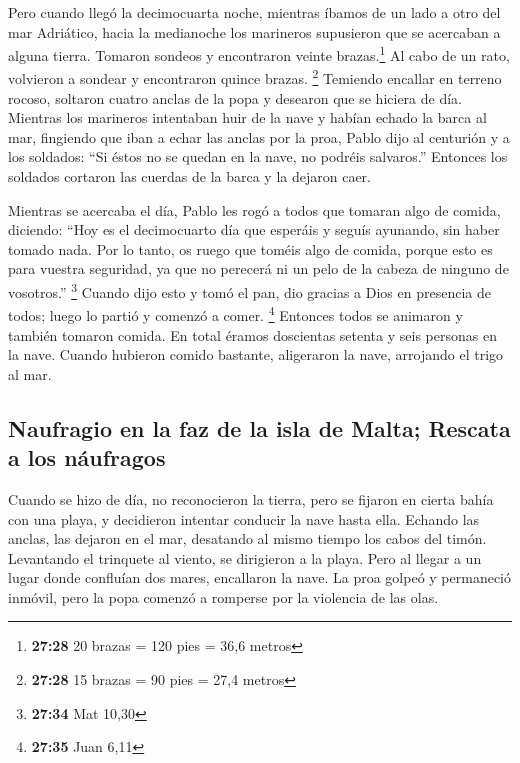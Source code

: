  Pero cuando llegó la decimocuarta noche, mientras íbamos
de un lado a otro del mar Adriático, hacia la medianoche los marineros
supusieron que se acercaban a alguna tierra.  Tomaron
sondeos y encontraron veinte brazas.\footnote{\textbf{27:28} 20 brazas =
  120 pies = 36,6 metros} Al cabo de un rato, volvieron a sondear y
encontraron quince brazas. \footnote{\textbf{27:28} 15 brazas = 90 pies
  = 27,4 metros}  Temiendo encallar en terreno rocoso,
soltaron cuatro anclas de la popa y desearon que se hiciera de día.
 Mientras los marineros intentaban huir de la nave y
habían echado la barca al mar, fingiendo que iban a echar las anclas por
la proa,  Pablo dijo al centurión y a los soldados: ``Si
éstos no se quedan en la nave, no podréis salvaros.'' 
Entonces los soldados cortaron las cuerdas de la barca y la dejaron
caer.

 Mientras se acercaba el día, Pablo les rogó a todos que
tomaran algo de comida, diciendo: ``Hoy es el decimocuarto día que
esperáis y seguís ayunando, sin haber tomado nada.  Por
lo tanto, os ruego que toméis algo de comida, porque esto es para
vuestra seguridad, ya que no perecerá ni un pelo de la cabeza de ninguno
de vosotros.'' \footnote{\textbf{27:34} Mat 10,30} 
Cuando dijo esto y tomó el pan, dio gracias a Dios en presencia de
todos; luego lo partió y comenzó a comer. \footnote{\textbf{27:35} Juan
  6,11}  Entonces todos se animaron y también tomaron
comida.  En total éramos doscientas setenta y seis
personas en la nave.  Cuando hubieron comido bastante,
aligeraron la nave, arrojando el trigo al mar.

\hypertarget{naufragio-en-la-faz-de-la-isla-de-malta-rescata-a-los-nuxe1ufragos}{%
\subsection{Naufragio en la faz de la isla de Malta; Rescata a los
náufragos}\label{naufragio-en-la-faz-de-la-isla-de-malta-rescata-a-los-nuxe1ufragos}}

 Cuando se hizo de día, no reconocieron la tierra, pero
se fijaron en cierta bahía con una playa, y decidieron intentar conducir
la nave hasta ella.  Echando las anclas, las dejaron en
el mar, desatando al mismo tiempo los cabos del timón. Levantando el
trinquete al viento, se dirigieron a la playa.  Pero al
llegar a un lugar donde confluían dos mares, encallaron la nave. La proa
golpeó y permaneció inmóvil, pero la popa comenzó a romperse por la
violencia de las olas.

